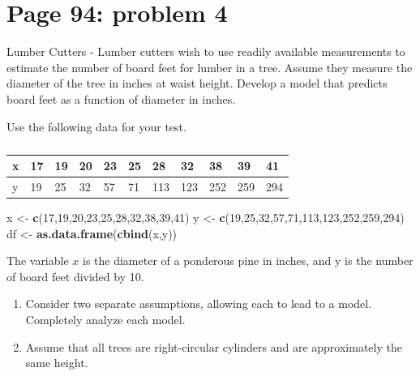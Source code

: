 \documentclass[]{article}
\newenvironment{Shaded}{\begin{snugshade}}{\end{snugshade}}
\newcommand{\KeywordTok}[1]{\textcolor[rgb]{0.13,0.29,0.53}{\textbf{{#1}}}}
\newcommand{\DecValTok}[1]{\textcolor[rgb]{0.00,0.00,0.81}{{#1}}}
\newcommand{\StringTok}[1]{\textcolor[rgb]{0.31,0.60,0.02}{{#1}}}
\newcommand{\NormalTok}[1]{{#1}}
\begin{document}
\section{Page 94: problem 4}\label{page-94-problem-4}

Lumber Cutters - Lumber cutters wish to use readily available
measurements to estimate the number of board feet for lumber in a tree.
Assume they measure the diameter of the tree in inches at waist height.
Develop a model that predicts board feet as a function of diameter in
inches.

Use the following data for your test.

\begin{table}[!htbp]
\centering
\caption{}
\label{my-label}
\begin{tabular}{l|llllllllll}
x & 17 & 19 & 20 & 23 & 25 & 28 & 32 & 38 & 39 & 41 \\ \hline
y & 19 & 25 & 32 & 57 & 71 & 113 & 123 & 252 & 259 & 294
\end{tabular}
\end{table}

\begin{Shaded}
\begin{Highlighting}[]
\NormalTok{x <-}\StringTok{ }\KeywordTok{c}\NormalTok{(}\DecValTok{17}\NormalTok{,}\DecValTok{19}\NormalTok{,}\DecValTok{20}\NormalTok{,}\DecValTok{23}\NormalTok{,}\DecValTok{25}\NormalTok{,}\DecValTok{28}\NormalTok{,}\DecValTok{32}\NormalTok{,}\DecValTok{38}\NormalTok{,}\DecValTok{39}\NormalTok{,}\DecValTok{41}\NormalTok{)}
\NormalTok{y <-}\StringTok{ }\KeywordTok{c}\NormalTok{(}\DecValTok{19}\NormalTok{,}\DecValTok{25}\NormalTok{,}\DecValTok{32}\NormalTok{,}\DecValTok{57}\NormalTok{,}\DecValTok{71}\NormalTok{,}\DecValTok{113}\NormalTok{,}\DecValTok{123}\NormalTok{,}\DecValTok{252}\NormalTok{,}\DecValTok{259}\NormalTok{,}\DecValTok{294}\NormalTok{)}
\NormalTok{df <-}\StringTok{ }\KeywordTok{as.data.frame}\NormalTok{(}\KeywordTok{cbind}\NormalTok{(x,y))}
\end{Highlighting}
\end{Shaded}

The variable \(x\) is the diameter of a ponderous pine in inches, and y
is the number of board feet divided by 10.

\begin{enumerate}
\def\labelenumi{\alph{enumi}.}
\item
  Consider two separate assumptions, allowing each to lead to a model.
  Completely analyze each model.
\item
  Assume that all trees are right-circular cylinders and are
  approximately the same height.
\end{enumerate}
\end{document}
